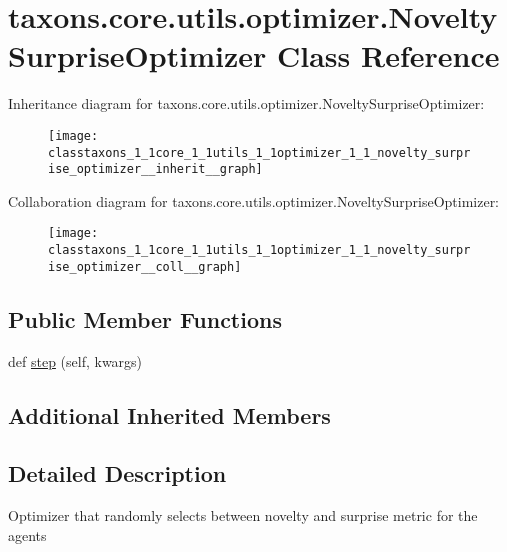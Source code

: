 \hypertarget{classtaxons_1_1core_1_1utils_1_1optimizer_1_1_novelty_surprise_optimizer}{}\section{taxons.\+core.\+utils.\+optimizer.\+Novelty\+Surprise\+Optimizer Class Reference}
\label{classtaxons_1_1core_1_1utils_1_1optimizer_1_1_novelty_surprise_optimizer}


Inheritance diagram for taxons.\+core.\+utils.\+optimizer.\+Novelty\+Surprise\+Optimizer\+:
\nopagebreak
\begin{figure}[H]
\begin{center}
\leavevmode
\texttt{[image: classtaxons\_1\_1core\_1\_1utils\_1\_1optimizer\_1\_1\_novelty\_surprise\_optimizer\_\_inherit\_\_graph]}
\end{center}
\end{figure}


Collaboration diagram for taxons.\+core.\+utils.\+optimizer.\+Novelty\+Surprise\+Optimizer\+:
\nopagebreak
\begin{figure}[H]
\begin{center}
\leavevmode
\texttt{[image: classtaxons\_1\_1core\_1\_1utils\_1\_1optimizer\_1\_1\_novelty\_surprise\_optimizer\_\_coll\_\_graph]}
\end{center}
\end{figure}
\subsection*{Public Member Functions}
\begin{DoxyCompactItemize}
\item 
def \hyperlink{classtaxons_1_1core_1_1utils_1_1optimizer_1_1_novelty_surprise_optimizer_a3f3d856cce79cf43df78a95a7e3dd77f}{step} (self, kwargs)
\end{DoxyCompactItemize}
\subsection*{Additional Inherited Members}


\subsection{Detailed Description}
\begin{DoxyVerb}Optimizer that randomly selects between novelty and surprise metric for the agents
\end{DoxyVerb}
 

